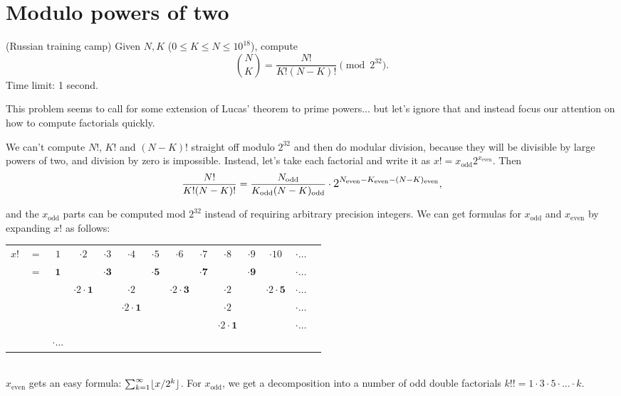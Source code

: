 \section{Modulo powers of two}
\begin{framed}
\noindent
(Russian training camp) Given $N, K$ ($0 \le K \le N \le 10^{18}$), compute
\[
\binom N K = \frac{N!}{K!(N-K)!} \pmod {2^{32}}.
\]
Time limit: 1 second.
\end{framed}
This problem seems to call for some extension of Lucas' theorem to prime powers... but let's ignore that and instead focus our attention on how to compute factorials quickly.

\newcommand{\odd}[1]{#1_\text{odd}}
\newcommand{\even}[1]{#1_\text{even}}

We can't compute $N!$, $K!$ and $(N-K)!$ straight off modulo $2^{32}$ and then do modular division, because they will be divisible by large powers of two, and division by zero is impossible.
Instead, let's take each factorial and write it as $x! = \odd{x}2^{\even{x}}$. Then
\[
\frac{N!}{K!(N-K)!} =
\frac{\odd N}{\odd K \odd{(N-K)}} \cdot \mathlarger{2^{\even N - \even K - \even{(N-K)}}},
\]

and the $\odd x$ parts can be computed mod $2^{32}$ instead of requiring arbitrary precision integers.
We can get formulas for $\odd x$ and $\even x$ by expanding $x!$ as follows: \\
\newcommand{\dig}[1]{\cdot 2 \cdot \mathbf{#1}}
\begin{tabular}{cccccccccccccc}
$x!$& $=$ & $1$        & $\cdot 2$ &$\cdot 3$         &$\cdot 4$ & $\cdot 5$         & $\cdot 6$ & $\cdot 7$         & $\cdot 8$ & $\cdot 9$         & $\cdot 10$ & $\cdot \ldots$ \\
    & $=$ & $\mathbf 1$&           &$\cdot \mathbf 3$ &          & $\cdot \mathbf 5$ &           & $\cdot \mathbf 7$ &           & $\cdot \mathbf 9$ &            & $\cdot \ldots$ \\
    &     &            & $\dig{1}$ &                  &$\cdot 2$ &                   & $\dig 3$  &                   & $\cdot 2$ &                   & $\dig 5$   & $\cdot \ldots$ \\
    &     &            &           &                  &$\dig 1$  &                   &           &                   & $\cdot 2$ &                   &            & $\cdot \ldots$ \\
    &     &            &           &                  &          &                   &           &                   & $\dig 1$  &                   &            & $\cdot \ldots$ \\
    &     & $\cdot \ldots$ &
\end{tabular}
\\
$\even x$ gets an easy formula: $\sum_{k=1}^\infty \lfloor x / 2^k\rfloor$.
For $\odd x$, we get a decomposition into a number of odd double factorials $k!! = 1 \cdot 3 \cdot 5 \cdot \ldots \cdot k$.

